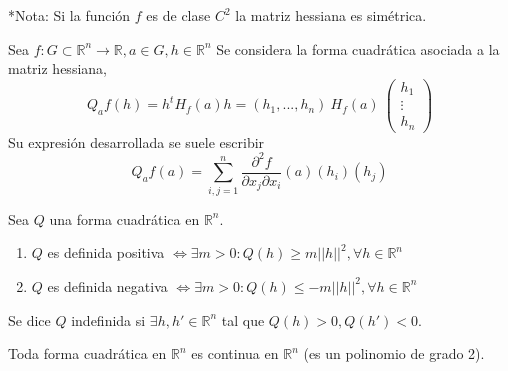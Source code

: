 \begin{obs}
*Nota: Si la función $f$ es de clase $C^2$ la matriz hessiana es simétrica.
\end{obs}

\begin{defn}
Sea $f:G\subset\mathbb{R}^n\rightarrow\mathbb{R}, a\in G, h\in\mathbb{R}^n$ Se considera la forma cuadrática asociada a la matriz hessiana, \[ Q_af(h) = h^t H_f(a)h = (h_1,...,h_n) \ H_f(a) \ \begin{pmatrix} h_1 \\\vdots\\h_n\end{pmatrix}\] Su expresión desarrollada se suele escribir \[ Q_af(a) = \sum^n_{i,j=1} \frac{\partial^2 f}{\partial x_j\partial x_i}(a)(h_i)(h_j) \]
\end{defn}

\begin{lem}
Sea $Q$ una forma cuadrática en $\mathbb{R}^n$.
\begin{enumerate}[label=(\roman*)]
    \item $Q$ es definida positiva $\Leftrightarrow \exists m > 0: Q(h) \geq m||h||^2, \forall h \in \mathbb{R}^n$ 
    \item $Q$ es definida negativa $\Leftrightarrow \exists m > 0: Q(h) \leq -m||h||^2, \forall h \in \mathbb{R}^n$
\end{enumerate}
\end{lem}

\begin{obs}
Se dice $Q$ indefinida si $\exists h,h'\in\mathbb{R}^n$ tal que $Q(h) > 0, Q(h') < 0.$
\end{obs}

\begin{obs}
Toda forma cuadrática en $\mathbb{R}^n$ es continua en $\mathbb{R}^n$ (es un polinomio de grado 2).
\end{obs}

